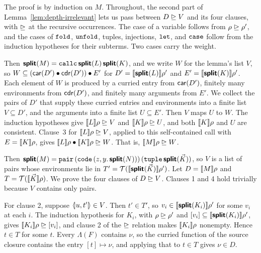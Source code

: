 The proof is by induction on $M$. Throughout, the second part of
Lemma~\ref{lem:depth-irrelevant} lets us pass between $D \mathrel{\trianglerighteq} V$ and
its four clauses, with ${\mathrel{\trianglerighteq}}$ at the recursive occurrences. The case of a variable follows from $\rho \mathrel{\trianglerighteq} \rho'$, and the cases of $\mathtt{fold}$, $\mathtt{unfold}$, tuples, injections, $\mathtt{let}$, and $\mathtt{case}$ follow from the induction hypotheses for their subterms. Two cases carry the weight.

 Then
$\textsf{\bfseries split}(M) = \mathtt{callc}\,\textsf{\bfseries split}(L)\,\textsf{\bfseries split}(K)$,
and we write $W$ for the lemma's list $V$, so $W \subseteq (\mathsf{car}(D') \mathbin{\bullet} \mathsf{cdr}(D')) \mathbin{\bullet} E'$ for
$D' = \llbracket \textsf{\bfseries split}(L) \rrbracket\rho'$ and
$E' = \llbracket \textsf{\bfseries split}(K) \rrbracket\rho'$. Each element of $W$ is produced by
a curried entry from $\mathsf{car}(D')$, finitely many environments from
$\mathsf{cdr}(D')$, and finitely many arguments from $E'$. We collect the pairs
of $D'$ that supply these curried entries and environments into a finite list
$V \subseteq D'$, and the arguments into a finite list
$U \subseteq E'$. Then $V$ maps $U$ to $W$. The induction hypotheses
give $\llbracket L \rrbracket\rho \mathrel{\trianglerighteq} V$ and $\llbracket K \rrbracket\rho \mathrel{\trianglerighteq} U$, and both
$\llbracket K \rrbracket\rho$ and $U$ are consistent. Clause~3 for
$\llbracket L \rrbracket\rho \mathrel{\trianglerighteq} V$, applied to this self-contained call with
$E = \llbracket K \rrbracket\rho$, gives $\llbracket L \rrbracket\rho \mathbin{\bullet} \llbracket K \rrbracket\rho \mathrel{\trianglerighteq} W$. That is,
$\llbracket M \rrbracket\rho \mathrel{\trianglerighteq} W$.

 Then
$\textsf{\bfseries split}(M) = \mathtt{pair}\,(\mathtt{code}\,(z, y.\,\textsf{\bfseries split}(N)))\,(\mathtt{tuple}\,\textsf{\bfseries split}(\vec{K}))$,
so $V$ is a list of pairs whose environments lie in
$T' = \mathcal{T}(\llbracket \textsf{\bfseries split}(\vec{K}) \rrbracket\rho')$. Let
$D = \llbracket M \rrbracket\rho$ and $T = \mathcal{T}(\llbracket \vec{K} \rrbracket\rho)$. We prove the
four clauses of $D \mathrel{\trianglerighteq} V$. Clauses 1 and 4 hold trivially
because $V$ contains only pairs.

For clause 2, suppose $\langle\!|u,t'|\!\rangle \in V$. Then
$t' \in T'$, so $v_i \in \llbracket \textsf{\bfseries split}(K_i) \rrbracket\rho'$ for some $v_i$ at each $i$.
The induction hypothesis for $K_i$, with $\rho \mathrel{\trianglerighteq} \rho'$ and
$[v_i] \subseteq \llbracket \textsf{\bfseries split}(K_i) \rrbracket\rho'$, gives
$\llbracket K_i \rrbracket\rho \mathrel{\trianglerighteq} [v_i]$, and clause 2 of the $\mathrel{\trianglerighteq}$ relation makes
$\llbracket K_i \rrbracket\rho$ nonempty. Hence $t \in T$ for some $t$. Every $\Lambda(F)$
contains $\nu$, so the curried function of the source closure contains the entry
$[t] \mapsto \nu$, and applying that to $t \in T$ gives $\nu \in D$.

